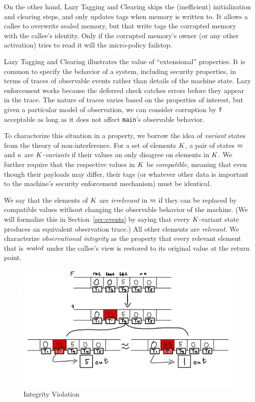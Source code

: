 \documentclass[10pt,conference]{ieeetran}%
\theoremstyle{definition}
\begin{document}
On the other hand, Lazy Tagging and Clearing skips the (inefficient)
initialization and clearing steps, and only updates tags when memory is written to.
It allows a callee to overwrite sealed memory, but that write tags the corrupted memory
with the callee's identity. Only if the corrupted memory's owner (or any other activation) tries
to read it will the micro-policy failstop.

Lazy Tagging and Clearing illustrates the value of ``extensional'' properties.
It is common to specify the behavior of a system, including security properties, in
terms of traces of observable events rather than details of the machine state.
Lazy enforcement works because the deferred check catches errors before they appear
in the trace. The nature of traces varies based on the properties of interest, but
given a particular model of observation, we can consider
corruption by {\tt f} acceptable as long as it does not affect {\tt main}'s observable behavior.

To characterize this situation in a property, we borrow the idea of \emph{variant} states
from the theory of non-interference. 
For a set of elements \(K\),
a pair of states \(m\) and \(n\) are {\em \(K\)-variants} if
their values an only disagree on elements in \(K\). We further require that
the respective values in \(K\) be \emph{compatible}, meaning that even though
their payloads may differ, their tags (or whatever other data is important to
the machine's security enforcement mechanism) must be identical. 

We say that the elements of \(K\) are \emph{irrelevant}
in \(m\) if they can be replaced by compatible values without changing the
observable behavior of the machine. (We will formalize this in Section~\ref{sec:events}
by saying that every \(K\)-variant state produces
an equivalent observation trace.) All other elements are \emph{relevant}.
We characterize \emph{observational integrity} as the property that
every relevant element that is \(\mathit{sealed}\) under the callee's view is restored
to its original value at the return point.

\begin{figure}
  \includegraphics[width=\columnwidth]{variants.png}
  \caption{Integrity Violation}
  \label{fig:variant}
\end{figure}
\end{document}
